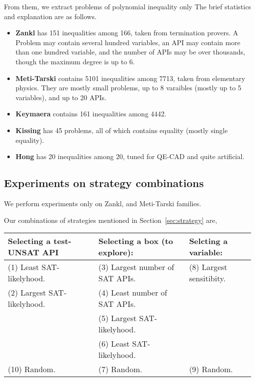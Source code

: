 From them, we extract problems of polynomial inequality only %
The brief statistics and explanation are as follows. 
\begin{itemize}
\item {\bf Zankl} has 151 inequalities among 166, taken from termination provers. 
A Problem may contain several hundred variables, an API may contain more than one hundred variable, 
and the number of APIs may be over thousands, though the maximum degree is up to $6$. 
\item {\bf Meti-Tarski} contains 5101 inequalities among 7713, taken from elementary physics.
They are mostly small problems, up to 8 varaibles (mostly up to 5 variables), and up to 20 APIs. 
\item {\bf Keymaera} contains 161 inequalities among 4442. 
\item {\bf Kissing} has 45 problems, all of which contains equality (mostly single equality). 
\item {\bf Hong} has 20 inequalities among 20, tuned for QE-CAD and quite artificial. 
\end{itemize}




\subsection{Experiments on strategy combinations} \label{sec:expstrategy}

We perform experiments only on Zankl, and Meti-Tarski families. 


Our combinations of strategies mentioned in Section~\ref{sec:strategy} are, 

\medskip
{\centering
\begin{tabular}{l|l|l}
Selecting a test-UNSAT API~~ & Selecting a box (to explore): & 
Selcting a variable: \\  %
\hline

(1) Least SAT-likelyhood. & 
(3) Largest number of SAT APIs.~~ & 
(8) Largest sensitibity. \\

(2) Largest SAT-likelyhood. & 
(4) Least number of SAT APIs. & \\

& (5) Largest SAT-likelyhood. & \\

& (6) Least SAT-likelyhood. & \\

(10) Random. & (7) Random. & (9) Random. \\
\end{tabular}
}
\medskip

